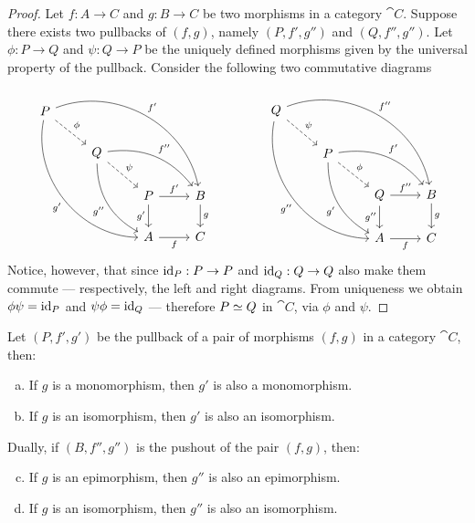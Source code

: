 \begin{proof}
Let \(f: A \to C\) and \(g: B \to C\) be two morphisms in a category \(\cat
C\). Suppose there exists two pullbacks of \((f, g)\), namely \((P, f', g'')\)
and \((Q, f'', g'')\). Let \(\phi: P \to Q\) and \(\psi: Q \to P\) be the
uniquely defined morphisms given by the universal property of the
pullback. Consider the following two commutative diagrams
\[
\begin{tikzcd}
P \ar[rd, dashed, "\phi"]
\ar[rrrdd, bend left=50, "f'"]
\ar[ddrrd, bend right=50, "g'"']
& & &
\\
&Q \ar[dr, dashed, "\psi"]
\ar[rrd, bend left, "f''"]
\ar[drd, bend right, "g''"']
& &
\\
& &P \ar[r, "f'"] \ar[d, "g'"']
&B \ar[d, "g"]
\\
& &A \ar[r, "f"'] &C
\end{tikzcd}
\qquad \qquad
\begin{tikzcd}
Q \ar[rd, dashed, "\psi"]
\ar[rrrdd, bend left=50, "f''"]
\ar[ddrrd, bend right=50, "g''"']
& & &
\\
&P \ar[dr, dashed, "\phi"]
\ar[rrd, bend left, "f'"]
\ar[drd, bend right, "g'"']
& &
\\
& &Q \ar[r, "f''"] \ar[d, "g''"']
&B \ar[d, "g"]
\\
& &A \ar[r, "f"'] &C
\end{tikzcd}
\]
Notice, however, that since \(\operatorname{id}_P: P \to P\) and \(\operatorname{id}_Q: Q \to Q\) also make
them commute --- respectively, the left and right diagrams. From uniqueness we
obtain \(\phi \psi = \operatorname{id}_P\) and \(\psi \phi = \operatorname{id}_Q\) --- therefore \(P \simeq
Q\) in \(\cat C\), via \(\phi\) and \(\psi\).
\end{proof}

\begin{proposition}
\label{prop:preservation-monic-epic-iso-by-pull-push}
Let \((P, f', g')\) be the pullback of a pair of morphisms \((f, g)\) in a
category \(\cat C\), then:
\begin{enumerate}[(a)]\setlength\itemsep{0em}
\item If \(g\) is a monomorphism, then \(g'\) is also a monomorphism.
\item If \(g\) is an isomorphism, then \(g'\) is also an isomorphism.
\end{enumerate}
Dually, if \((B, f'', g'')\) is the pushout of the pair \((f, g)\), then:
\begin{enumerate}[(a)]\setcounter{enumi}{2}\setlength\itemsep{0em}
\item If \(g\) is an epimorphism, then \(g''\) is also an epimorphism.
\item If \(g\) is an isomorphism, then \(g''\) is also an isomorphism.
\end{enumerate}
\end{proposition}


